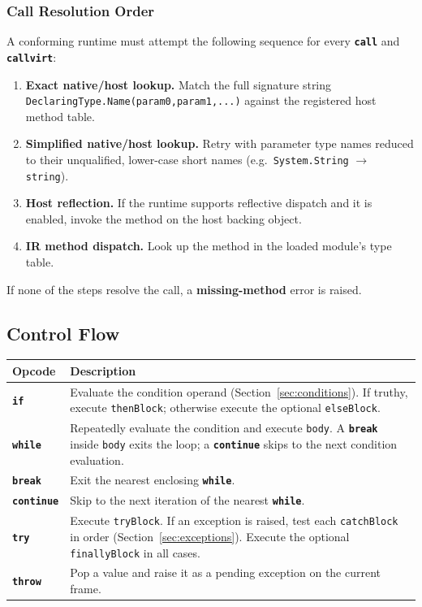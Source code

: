 \documentclass[11pt,a4paper]{article}
\newcommand{\code}[1]{\texttt{\small #1}}
\newcommand{\opcode}[1]{\textbf{\texttt{#1}}}
\begin{document}
\subsubsection{Call Resolution Order}
\label{sec:callres}

A conforming runtime must attempt the following sequence for every
\opcode{call} and \opcode{callvirt}:

\begin{enumerate}[leftmargin=2em]
  \item \textbf{Exact native/host lookup.} Match the full signature string
    \code{DeclaringType.Name(param0,param1,...)} against the registered
    host method table.
  \item \textbf{Simplified native/host lookup.} Retry with parameter type
    names reduced to their unqualified, lower-case short names
    (e.g.\ \code{System.String} $\to$ \code{string}).
  \item \textbf{Host reflection.} If the runtime supports reflective dispatch
    and it is enabled, invoke the method on the host backing object.
  \item \textbf{IR method dispatch.} Look up the method in the loaded
    module's type table.
\end{enumerate}

If none of the steps resolve the call, a \textbf{missing-method} error is
raised.

\subsection{Control Flow}

\begin{longtable}{lp{10.5cm}}
  \toprule
  \textbf{Opcode}    & \textbf{Description} \\
  \midrule
  \endhead
  \opcode{if}        &
    Evaluate the condition operand (Section~\ref{sec:conditions}).
    If truthy, execute \code{thenBlock};
    otherwise execute the optional \code{elseBlock}. \\
  \opcode{while}     &
    Repeatedly evaluate the condition and execute \code{body}.
    A \opcode{break} inside \code{body} exits the loop;
    a \opcode{continue} skips to the next condition evaluation. \\
  \opcode{break}     & Exit the nearest enclosing \opcode{while}. \\
  \opcode{continue}  & Skip to the next iteration of the nearest \opcode{while}. \\
  \opcode{try}       &
    Execute \code{tryBlock}. If an exception is raised, test each
    \code{catchBlock} in order (Section~\ref{sec:exceptions}).
    Execute the optional \code{finallyBlock} in all cases. \\
  \opcode{throw}     &
    Pop a value and raise it as a pending exception on the current frame. \\
  \bottomrule
\end{longtable}
\end{document}
